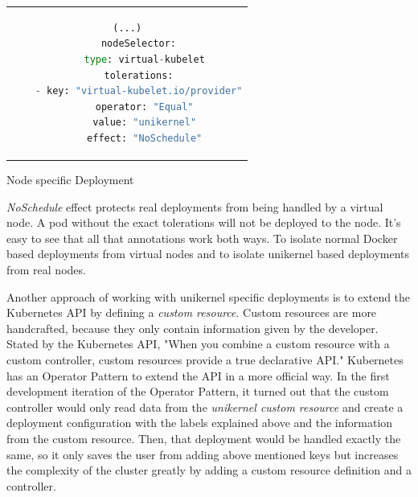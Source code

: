 \begin{code}[htpb]
  \centering
  \begin{tabular}{c}
  \begin{lstlisting}[language=python]
    (...)
    nodeSelector:
      type: virtual-kubelet
    tolerations:
    - key: "virtual-kubelet.io/provider"
      operator: "Equal"
      value: "unikernel"
      effect: "NoSchedule"
\end{lstlisting}
\end{tabular}
\caption{Node specific Deployment}\label{fig:deployment}
\end{code}
\textit{NoSchedule} effect protects real deployments from being handled by a virtual node. A pod without the exact tolerations will not be deployed to the node. It's easy to see that all that annotations work both ways. To isolate normal Docker based deployments from virtual nodes and to isolate unikernel based deployments from real nodes.

Another approach of working with unikernel specific deployments is to extend the Kubernetes API by defining a \textit{custom resource}. Custom resources are more handcrafted, because they only contain information given by the developer. Stated by the Kubernetes API, "When you combine a custom resource with a custom controller, custom resources provide a true declarative API." Kubernetes has an Operator Pattern to extend the API in a more official way. In the first development iteration of the Operator Pattern, it turned out that the custom controller would only read data from the \textit{unikernel custom resource} and create a deployment configuration with the labels explained above and the information from the custom resource. Then, that deployment would be handled exactly the same, so it only saves the user from adding above mentioned keys but increases the complexity of the cluster greatly by adding a custom resource definition and a controller.

